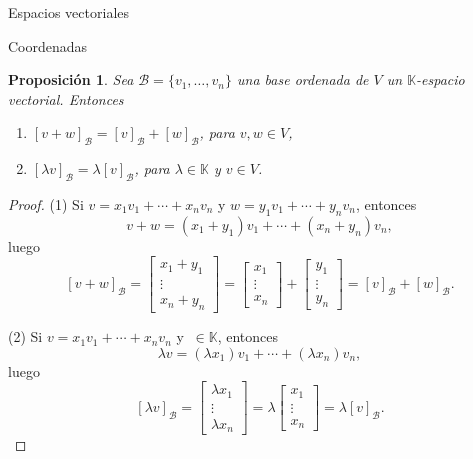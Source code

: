 \documentclass[a4paper,12pt,twoside,spanish,reqno]{amsbook}
\newtheorem{proposicion}[teorema]{Proposici\'on}
\theoremstyle{definition}
\theoremstyle{remark}
\newcommand{\K}{\mathbb K}
\begin{document}
\begin{chapter}{Espacios vectoriales}
\begin{section}{Coordenadas}
    \begin{proposicion}\label{vectorbase->lineal}
        Sea $\mathcal{B}=\{v_1,\ldots,v_n\}$ una base ordenada de $V$ un $\K$-espacio vectorial. Entonces
        \begin{enumerate}
            \item $[v + w]_\mathcal{B} = [v]_\mathcal{B} +[w]_\mathcal{B}$, para $v,w \in V$,
            \item $[\lambda v]_\mathcal{B} = \lambda[v]_\mathcal{B}$, para $\lambda \in \K$ y $v \in V$.
        \end{enumerate}
    \end{proposicion} 
    \begin{proof}
        (1) Si $v = x_1v_1 + \cdots +x_nv_n$ y $w = y_1v_1 + \cdots +y_nv_n$, entonces 
        $$
        v + w = (x_1+y_1)v_1 + \cdots +(x_n+y_n)v_n,
        $$
        luego
        $$
        [v + w]_\mathcal{B} = \begin{bmatrix}x_1+y_1 \\ \vdots \\ x_n+y_n\end{bmatrix}
        = \begin{bmatrix}x_1 \\ \vdots \\ x_n\end{bmatrix}+\begin{bmatrix}y_1 \\ \vdots \\ y_n\end{bmatrix} = [v]_\mathcal{B} +[w]_\mathcal{B}.
        $$
        
        (2) Si $v = x_1v_1 + \cdots +x_nv_n$ y $\ \in \K$, entonces 
        $$
        \lambda v = (\lambda x_1)v_1 + \cdots +(\lambda x_n)v_n,
        $$
        luego
        $$
        [\lambda v ]_\mathcal{B} = \begin{bmatrix}\lambda x_1 \\ \vdots \\ \lambda x_n\end{bmatrix}
        = \lambda \begin{bmatrix}x_1 \\ \vdots \\ x_n\end{bmatrix} = \lambda [v]_\mathcal{B}.
        $$
    \end{proof}
    

\end{section}
\end{chapter}
\end{document}

